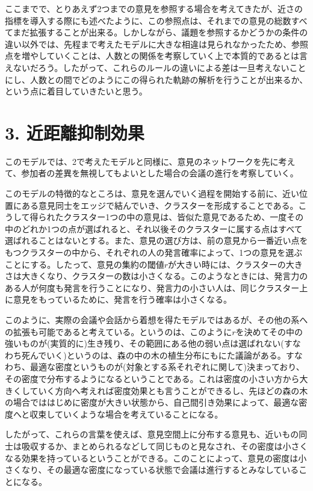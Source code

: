 \documentclass[letterpaper,10pt,english]{sphinxmanual}
\begin{document}
ここまでで、とりあえず2つまでの意見を参照する場合を考えてきたが、近さの指標を導入する際にも述べたように、この参照点は、それまでの意見の総数すべてまだ拡張することが出来る。しかしながら、議題を参照するかどうかの条件の違い以外では、先程まで考えたモデルに大きな相違は見られなかったため、参照点を増やしていくことは、人数との関係を考察していく上で本質的であるとは言えないだろう。したがって、これらのルールの違いによる差は一旦考えないことにし、人数との間でどのようにこの得られた軌跡の解析を行うことが出来るか、という点に着目していきたいと思う。


\section{3. 近距離抑制効果}
\label{draft:id8}
このモデルでは、2で考えたモデルと同様に、意見のネットワークを先に考えて、参加者の差異を無視してもよいとした場合の会議の進行を考察していく。

このモデルの特徴的なところは、意見を選んでいく過程を開始する前に、近い位置にある意見同士をエッジで結んでいき、クラスターを形成することである。こうして得られたクラスター1つの中の意見は、皆似た意見であるため、一度その中のどれか1つの点が選ばれると、それ以後そのクラスターに属する点はすべて選ばれることはないとする。また、意見の選び方は、前の意見から一番近い点をもつクラスターの中から、それぞれの人の発言確率によって、1つの意見を選ぶことにする。したって、意見の集約の閾値\(r\)が大きい時には、クラスターの大きさは大きくなり、クラスターの数は小さくなる。このようなときには、発言力のある人が何度も発言を行うことになり、発言力の小さい人は、同じクラスター上に意見をもっているために、発言を行う確率は小さくなる。

このように、実際の会議や会話から着想を得たモデルではあるが、その他の系への拡張も可能であると考えている。というのは、このように\(r\)を決めてその中の強いものが(実質的に)生き残り、その範囲にある他の弱い点は選ばれない(すなわち死んでいく)というのは、森の中の木の植生分布にもにた議論がある。すなわち、最適な密度というものが(対象とする系それぞれに関して)決まっており、その密度で分布するようになるということである。これは密度の小さい方から大きくしていく方向へ考えれば密度効果とも言うことができるし、先ほどの森の木の場合でははじめに密度が大きい状態から、自己間引き効果によって、最適な密度へと収束していくような場合を考えていることになる。

したがって、これらの言葉を使えば、意見空間上に分布する意見も、近いもの同士は吸収するか、まとめられるなどして同じものと見なされ、その密度は小さくなる効果を持っているということができる。このことによって、意見の密度は小さくなり、その最適な密度になっている状態で会議は進行するとみなしていることになる。
\end{document}
